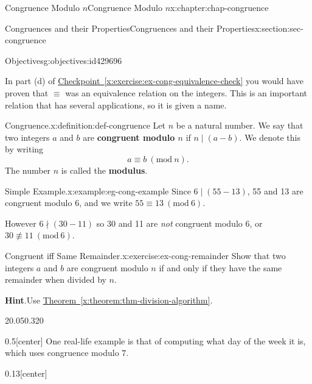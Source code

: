 \documentclass[oneside,10pt,]{book}
\newcommand{\blocktitlefont}{\relax}
\newcommand{\xreffont}{\relax}
\newcommand{\terminology}[1]{\textbf{#1}}
\numberwithin{equation}{section}
\newcommand{\Mod}[1]{\ \left(\mathrm{mod}\ #1\right)}
\begin{document}
\begin{chapterptx}{Congruence Modulo \(n\)}{}{Congruence Modulo \(n\)}{}{}{x:chapter:chap-congruence}
\begin{sectionptx}{Congruences and their Properties}{}{Congruences and their Properties}{}{}{x:section:sec-congruence}
\begin{objectives}{Objectives}{g:objectives:id429696}
\end{objectives}
In part (d) of \hyperref[x:exercise:ex-cong-equivalence-check]{Checkpoint~{\xreffont\ref{x:exercise:ex-cong-equivalence-check}}} you would have proven that \(\equiv\) was an equivalence relation on the integers. This is an important relation that has several applications, so it is given a name.%
\begin{definition}{Congruence.}{x:definition:def-congruence}%
Let \(n\) be a natural number. We say that two integers \(a\) and \(b\) are \terminology{congruent modulo \(n\)} if \(n \mid (a-b)\). We denote this by writing%
\begin{equation*}
a \equiv b \Mod{n}\text{.}
\end{equation*}
The number \(n\) is called the \terminology{modulus}. \label{g:notation:id429961}%
\end{definition}
\begin{example}{Simple Example.}{x:example:eg-cong-example}%
Since \(6 \mid (55-13)\), 55 and 13 are congruent modulo 6, and we write \(55 \equiv 13 \Mod{6}\).%
\par
However \(6 \nmid (30-11)\) so 30 and 11 are \emph{not} congruent modulo 6, or \(30 \not\equiv 11 \Mod{6}\).%
\end{example}
\begin{inlineexercise}{Congruent iff Same Remainder.}{x:exercise:ex-cong-remainder}%
Show that two integers \(a\) and \(b\) are congruent modulo \(n\) if and only if they have the same remainder when divided by \(n\).%
\par\smallskip%
\noindent\textbf{\blocktitlefont Hint}.\hypertarget{g:hint:id430218}{}\quad{}Use \hyperref[x:theorem:thm-division-algorithm]{Theorem~{\xreffont\ref{x:theorem:thm-division-algorithm}}}.%
\end{inlineexercise}
\begin{sidebyside}{2}{0.05}{0.32}{0}%
\begin{sbspanel}{0.5}[center]%
One real-life example is that of computing what day of the week it is, which uses congruence modulo \(7\).%
\end{sbspanel}%
\begin{sbspanel}{0.13}[center]%

\end{sbspanel}
\end{sidebyside}
\end{sectionptx}
\end{chapterptx}
\end{document}
